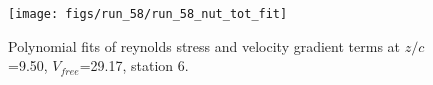 \begin{figure}[H]
\centering
\texttt{[image: figs/run\_58/run\_58\_nut\_tot\_fit]}
\caption{Polynomial fits of reynolds stress and velocity gradient terms at $z/c$=9.50, $V_{free}$=29.17, station 6.}
\label{fig:run_58_nut_tot_fit}
\end{figure}


